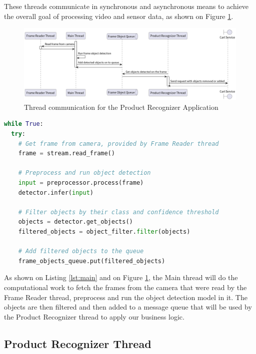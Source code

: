 \documentclass[openright]{normas-utf-tex} %
\begin{document}
These threads communicate in synchronous and asynchronous means to achieve the overall goal of processing video and sensor data, as shown on Figure \ref{fig:threads}.

\begin{figure}[H]
	\centering
	\includegraphics[width=1\textwidth]{./images/Product Recognizer Thread communication.png}
	\caption[Thread communication for the Product Recognizer Appplication]{Thread communication for the Product Recognizer Application}
	\label{fig:threads}
\end{figure}

\begin{lstlisting}[language=Python,caption={Loop of the Main Thread. Some details were ommitted for the sake of brevity},label={lst:main}]
while True:
  try:
    # Get frame from camera, provided by Frame Reader thread
    frame = stream.read_frame()

    # Preprocess and run object detection
    input = preprocessor.process(frame)
    detector.infer(input)

    # Filter objects by their class and confidence threshold
    objects = detector.get_objects()
    filtered_objects = object_filter.filter(objects)

    # Add filtered objects to the queue
    frame_objects_queue.put(filtered_objects)
\end{lstlisting}

As shown on Listing \ref{lst:main} and on Figure \ref{fig:threads}, the Main
thread will do the computational work to fetch the frames from the camera that
were read by the Frame Reader thread, preprocess and run the object detection
model in it. The objects are then filtered and then added to a message queue
that will be used by the Product Recognizer thread to apply our business logic.

\subsection{Product Recognizer Thread}
\end{document}
